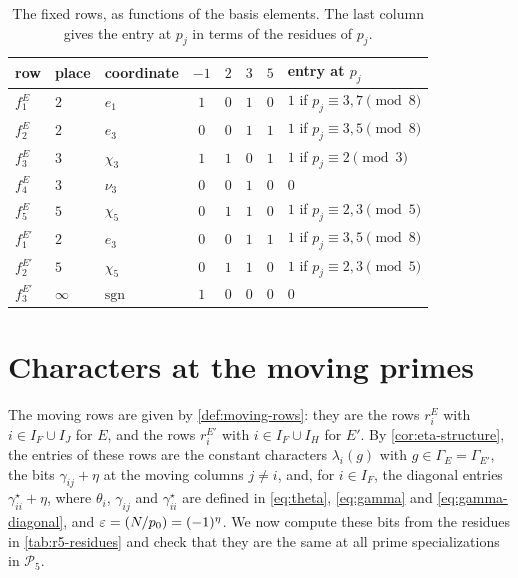 \documentclass[12pt,oneside,openany]{book}
\theoremstyle{definition}
\theoremstyle{plain}
\numberwithin{equation}{chapter}
\theoremstyle{plain}
\theoremstyle{definition}
\theoremstyle{remark}
\newcommand{\leg}[2]{\mathchoice{\left(\frac{#1}{#2}\right)}{(#1/#2)}{(#1/#2)}{(#1/#2)}}
\newcommand{\cP}{\mathcal P}
\newcommand{\eps}{\varepsilon}
\begin{document}
\begin{table}[htbp]
\centering
\caption{The fixed rows, as functions of the basis elements. The last column gives the entry at $p_j$ in terms of the residues of $p_j$.}\label{tab:r5-fixed-rows}
\begin{tabular}{lllccccl}
\toprule
row & place & coordinate & $-1$ & $2$ & $3$ & $5$ & entry at $p_j$\\
\midrule
$f^E_1$ & $2$ & $e_1$ & $1$ & $0$ & $1$ & $0$ & $1$ if $p_j\equiv3,7\pmod8$\\
$f^E_2$ & $2$ & $e_3$ & $0$ & $0$ & $1$ & $1$ & $1$ if $p_j\equiv3,5\pmod8$\\
$f^E_3$ & $3$ & $\chi_3$ & $1$ & $1$ & $0$ & $1$ & $1$ if $p_j\equiv2\pmod3$\\
$f^E_4$ & $3$ & $\nu_3$ & $0$ & $0$ & $1$ & $0$ & $0$\\
$f^E_5$ & $5$ & $\chi_5$ & $0$ & $1$ & $1$ & $0$ & $1$ if $p_j\equiv2,3\pmod5$\\
\midrule
$f^{E'}_1$ & $2$ & $e_3$ & $0$ & $0$ & $1$ & $1$ & $1$ if $p_j\equiv3,5\pmod8$\\
$f^{E'}_2$ & $5$ & $\chi_5$ & $0$ & $1$ & $1$ & $0$ & $1$ if $p_j\equiv2,3\pmod5$\\
$f^{E'}_3$ & $\infty$ & $\mathrm{sgn}$ & $1$ & $0$ & $0$ & $0$ & $0$\\
\bottomrule
\end{tabular}
\end{table}

\section{Characters at the moving primes}\label{sec:r5-characters}

The moving rows are given by \cref{def:moving-rows}: they are the rows $r^E_i$ with $i\in I_F\cup I_J$ for $E$, and the rows $r^{E'}_i$ with $i\in I_F\cup I_H$ for $E'$. By \cref{cor:eta-structure}, the entries of these rows are the constant characters $\lambda_i(g)$ with $g\in\Gamma_E=\Gamma_{E'}$, the bits $\gamma_{ij}+\eta$ at the moving columns $j\ne i$, and, for $i\in I_F$, the diagonal entries $\gamma^\star_{ii}+\eta$, where $\theta_i$, $\gamma_{ij}$ and $\gamma^\star_{ii}$ are defined in \eqref{eq:theta}, \eqref{eq:gamma} and \eqref{eq:gamma-diagonal}, and $\eps=\leg N{p_0}=(-1)^\eta$. We now compute these bits from the residues in \cref{tab:r5-residues} and check that they are the same at all prime specializations in $\cP_5$.
\end{document}
